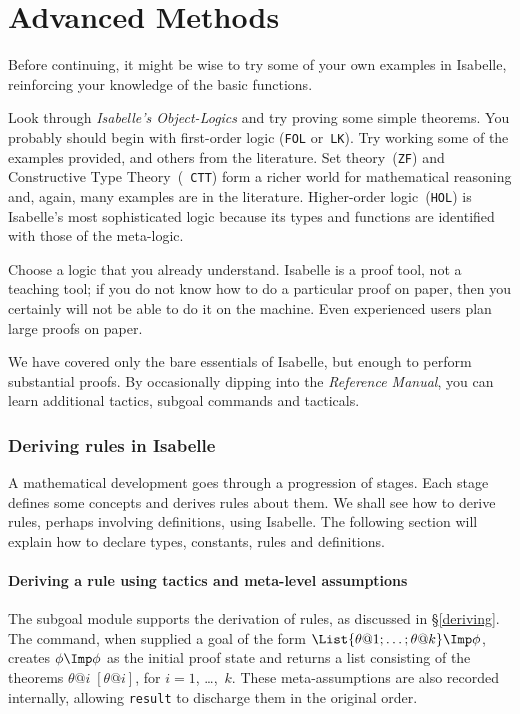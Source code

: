 \part{Advanced Methods}
Before continuing, it might be wise to try some of your own examples in
Isabelle, reinforcing your knowledge of the basic functions.

Look through {\em Isabelle's Object-Logics\/} and try proving some simple
theorems.  You probably should begin with first-order logic ({\tt FOL}
or~{\tt LK}).  Try working some of the examples provided, and others from
the literature.  Set theory~({\tt ZF}) and Constructive Type Theory~({\tt
  CTT}) form a richer world for mathematical reasoning and, again, many
examples are in the literature.  Higher-order logic~({\tt HOL}) is
Isabelle's most sophisticated logic because its types and functions are
identified with those of the meta-logic.

Choose a logic that you already understand.  Isabelle is a proof
tool, not a teaching tool; if you do not know how to do a particular proof
on paper, then you certainly will not be able to do it on the machine.
Even experienced users plan large proofs on paper.

We have covered only the bare essentials of Isabelle, but enough to perform
substantial proofs.  By occasionally dipping into the {\em Reference
Manual}, you can learn additional tactics, subgoal commands and tacticals.


\section{Deriving rules in Isabelle}
A mathematical development goes through a progression of stages.  Each
stage defines some concepts and derives rules about them.  We shall see how
to derive rules, perhaps involving definitions, using Isabelle.  The
following section will explain how to declare types, constants, rules and
definitions.


\subsection{Deriving a rule using tactics and meta-level assumptions} 
\label{deriving-example}

The subgoal module supports the derivation of rules, as discussed in
\S\ref{deriving}.  The  command, when supplied a goal of the
form $\List{\theta@1; \ldots; \theta@k} \Imp \phi$, creates $\phi\Imp\phi$
as the initial proof state and returns a list consisting of the theorems
${\theta@i\;[\theta@i]}$, for $i=1$, \ldots,~$k$.  These meta-assumptions
are also recorded internally, allowing {\tt result} to discharge them
in the original order.

